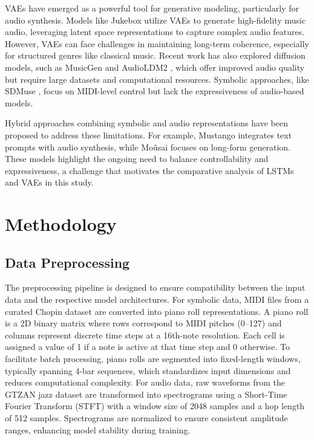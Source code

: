 \documentclass[conference]{IEEEtran}
\begin{document}
VAEs have emerged as a powerful tool for generative modeling, particularly for audio synthesis. Models like Jukebox \cite{dhariwal2020jukebox} utilize VAEs to generate high-fidelity music audio, leveraging latent space representations to capture complex audio features. However, VAEs can face challenges in maintaining long-term coherence, especially for structured genres like classical music. Recent work has also explored diffusion models, such as MusicGen \cite{copet2024simplecontrollablemusicgeneration} and AudioLDM2 \cite{liu2024audioldm2learningholistic}, which offer improved audio quality but require large datasets and computational resources. Symbolic approaches, like SDMuse \cite{zhang2022sdmusestochasticdifferentialmusic}, focus on MIDI-level control but lack the expressiveness of audio-based models.

Hybrid approaches combining symbolic and audio representations have been proposed to address these limitations. For example, Mustango \cite{melechovsky2024mustangocontrollabletexttomusicgeneration} integrates text prompts with audio synthesis, while Moûsai \cite{schneider2023mousaitexttomusicgenerationlongcontext} focuses on long-form generation. These models highlight the ongoing need to balance controllability and expressiveness, a challenge that motivates the comparative analysis of LSTMs and VAEs in this study.

\section{Methodology}
\label{sec:methodology}

\subsection{Data Preprocessing}
The preprocessing pipeline is designed to ensure compatibility between the input data and the respective model architectures. For symbolic data, MIDI files from a curated Chopin dataset are converted into piano roll representations. A piano roll is a 2D binary matrix where rows correspond to MIDI pitches (0–127) and columns represent discrete time steps at a 16th-note resolution. Each cell is assigned a value of 1 if a note is active at that time step and 0 otherwise. To facilitate batch processing, piano rolls are segmented into fixed-length windows, typically spanning 4-bar sequences, which standardizes input dimensions and reduces computational complexity. For audio data, raw waveforms from the GTZAN jazz dataset are transformed into spectrograms using a Short-Time Fourier Transform (STFT) with a window size of 2048 samples and a hop length of 512 samples. Spectrograms are normalized to ensure consistent amplitude ranges, enhancing model stability during training.
\end{document}
